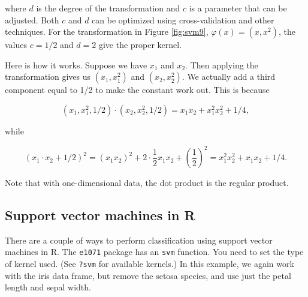 \documentclass[
]{book}
\newenvironment{Shaded}{\begin{snugshade}}{\end{snugshade}}
\newcommand{\AttributeTok}[1]{\textcolor[rgb]{0.13,0.29,0.53}{#1}}
\newcommand{\DecValTok}[1]{\textcolor[rgb]{0.00,0.00,0.81}{#1}}
\newcommand{\FloatTok}[1]{\textcolor[rgb]{0.00,0.00,0.81}{#1}}
\newcommand{\FunctionTok}[1]{\textcolor[rgb]{0.13,0.29,0.53}{\textbf{#1}}}
\newcommand{\NormalTok}[1]{#1}
\newcommand{\OtherTok}[1]{\textcolor[rgb]{0.56,0.35,0.01}{#1}}
\newcommand{\SpecialCharTok}[1]{\textcolor[rgb]{0.81,0.36,0.00}{\textbf{#1}}}
\newcommand{\StringTok}[1]{\textcolor[rgb]{0.31,0.60,0.02}{#1}}
\theoremstyle{definition}
\theoremstyle{definition}
\theoremstyle{definition}
\theoremstyle{definition}
\theoremstyle{remark}
\begin{document}
where \(d\) is the degree of the transformation and \(c\) is a parameter that can be adjusted. Both \(c\) and \(d\) can be optimized using cross-validation and other techniques. For the transformation in Figure \ref{fig:svm9}, \(\varphi(x)=(x,x^2)\), the values \(c=1/2\) and \(d=2\) give the proper kernel.

Here is how it works. Suppose we have \(x_1\) and \(x_2\). Then applying the transformation gives us \((x_1,x_1^2)\) and \((x_2,x_2^2)\). We actually add a third component equal to 1/2 to make the constant work out. This is because

\[(x_1,x_1^2,1/2)\cdot(x_2,x_2^2,1/2)=x_1x_2+x_1^2x_2^2+1/4,\]

while

\[(x_1\cdot x_2+1/2)^2=(x_1x_2)^2+2\cdot\frac{1}{2}x_1x_2+(\frac{1}{2})^2=x_1^2x_2^2+x_1x_2+1/4.\]

Note that with one-dimensional data, the dot product is the regular product.

\subsection*{Support vector machines in R}\label{support-vector-machines-in-r}

There are a couple of ways to perform classification using support vector machines in R. The \texttt{e1071} package has an \texttt{svm} function. You need to set the type of kernel used. (See \texttt{?svm} for available kernels.) In this example, we again work with the iris data frame, but remove the setosa species, and use just the petal length and sepal width.

\begin{Shaded}
\end{Shaded}
\end{document}
